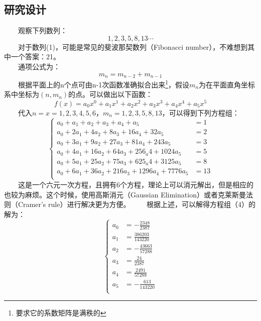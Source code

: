 \documentclass[12pt]{article}
\begin{document}
      \subsection{研究设计}
        　　观察下列数列：
        \begin{equation}
          1, 2, 3, 5, 8, 13\cdots
        \end{equation}
        　　对于数列(1)，可能是常见的斐波那契数列（Fibonacci number），不难想到其中一个答案：21。\\
        　　通项公式为：
        \begin{equation}
          m_{n}=m_{n-2}+m_{n-1}
        \end{equation}
        　　根据平面上的n个点可由n-1次函数准确拟合出来\footnote{要求它的系数矩阵是满秩的}，假设$m_{n}$为在平面直角坐标系中坐标为$(n,m_{n})$的点。可以做出以下函数：
        \begin{equation}
          f(x)=a_{0}x^{0}+a_{1}x^{1}+a_{2}x^{2}+a_{3}x^{3}+a_{4}x^{4}+a_{5}x^{5}
        \end{equation}
        　　代入$n=x=1,2,3,4,5,6$，$m_{n}=1,2,3,5,8,13$，可以得到下列方程组：
        \begin{equation}
          \left\{
            \begin{aligned}
              a_{0}+a_{1}+a_{2}+a_{3}+a_{4}+a_{5}&=1\\
              a_{0}+2a_{1}+4a_{2}+8a_{3}+16a_{4}+32a_{5}&=2\\
              a_{0}+3a_{1}+9a_{2}+27a_{3}+81a_{4}+243a_{5}&=3\\
              a_{0}+4a_{1}+16a_{2}+64a_{3}+256_a{4}+1024a_{5}&=5\\
              a_{0}+5a_{1}+25a_{2}+75a_{3}+625_a{4}+3125a_{5}&=8\\
              a_{0}+6a_{1}+36a_{2}+216a_{3}+1296a_{4}+7776a_{5}&=13\\
            \end{aligned}
          \right.
        \end{equation}
        　　这是一个六元一次方程，且拥有6个方程，理论上可以消元解出，但是相应的也较为麻烦。这个时候，使用高斯消元（Gaussian Elimination）或者克莱斯曼法则（Cramer's rule）进行解决更为方便。
        　　根据上述，可以解得方程组（4）的解为：
        \begin{equation}
          \left\{
            \begin{aligned}
              a_{0}&=-\frac{2348}{2387}\\
              a_{1}&=\frac{386203}{143220}\\
              a_{2}&=-\frac{43663}{57288}\\
              a_{3}&=\frac{24}{2387}\\
              a_{4}&=\frac{2491}{57288}\\
              a_{5}&=-\frac{613}{143220}\\
            \end{aligned}
          \right.
        \end{equation}
\end{document}
